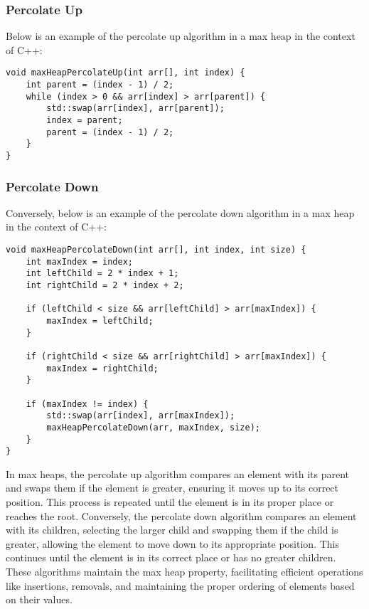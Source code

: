 \begin{solution}

\subsubsection{Percolate Up}

Below is an example of the percolate up algorithm in a max heap in the context of C++:

\horizontalline

\begin{verbatim}
void maxHeapPercolateUp(int arr[], int index) {
    int parent = (index - 1) / 2;
    while (index > 0 && arr[index] > arr[parent]) {
        std::swap(arr[index], arr[parent]);
        index = parent;
        parent = (index - 1) / 2;
    }
}    
\end{verbatim}

\horizontalline

\subsubsection{Percolate Down}

Conversely, below is an example of the percolate down algorithm in a max heap in the context of C++:

\horizontalline

\begin{verbatim}
void maxHeapPercolateDown(int arr[], int index, int size) {
    int maxIndex = index;
    int leftChild = 2 * index + 1;
    int rightChild = 2 * index + 2;

    if (leftChild < size && arr[leftChild] > arr[maxIndex]) {
        maxIndex = leftChild;
    }

    if (rightChild < size && arr[rightChild] > arr[maxIndex]) {
        maxIndex = rightChild;
    }

    if (maxIndex != index) {
        std::swap(arr[index], arr[maxIndex]);
        maxHeapPercolateDown(arr, maxIndex, size);
    }
}    
\end{verbatim}

\horizontalline

In max heaps, the percolate up algorithm compares an element with its parent and swaps them if the element is greater, ensuring it moves up to its correct position. This process is repeated until the element is 
in its proper place or reaches the root. Conversely, the percolate down algorithm compares an element with its children, selecting the larger child and swapping them if the child is greater, allowing the element 
to move down to its appropriate position. This continues until the element is in its correct place or has no greater children. These algorithms maintain the max heap property, facilitating efficient operations 
like insertions, removals, and maintaining the proper ordering of elements based on their values.

\end{solution}

